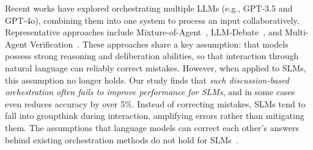 
Recent works have explored orchestrating multiple LLMs (e.g., GPT-3.5 and GPT-4o), combining them into one system to process an input collaboratively. Representative approaches include Mixture-of-Agent~\citep{wang2024mixtureofagentsenhanceslargelanguage}, LLM-Debate~\citep{du2023improvingfactualityreasoninglanguage}, and Multi-Agent Verification~\citep{lifshitz2025multiagentverificationscalingtesttime}. These approaches share a key assumption: that models possess strong reasoning and deliberation abilities, so that interaction through natural language can reliably correct mistakes. However, when applied to SLMs, this assumption no longer holds. Our study finds that \emph{such discussion-based orchestration often fails to improve performance for SLMs}, and in some cases even reduces accuracy by over 5\%. Instead of correcting mistakes, SLMs tend to fall into groupthink during interaction, amplifying errors rather than mitigating them. The assumptions that language models can correct each other's answers behind existing orchestration methods do not hold for SLMs~\citep{Taubenfeld_2024,huang2024largelanguagemodelsselfcorrect,liu2023lostmiddlelanguagemodels}. 





